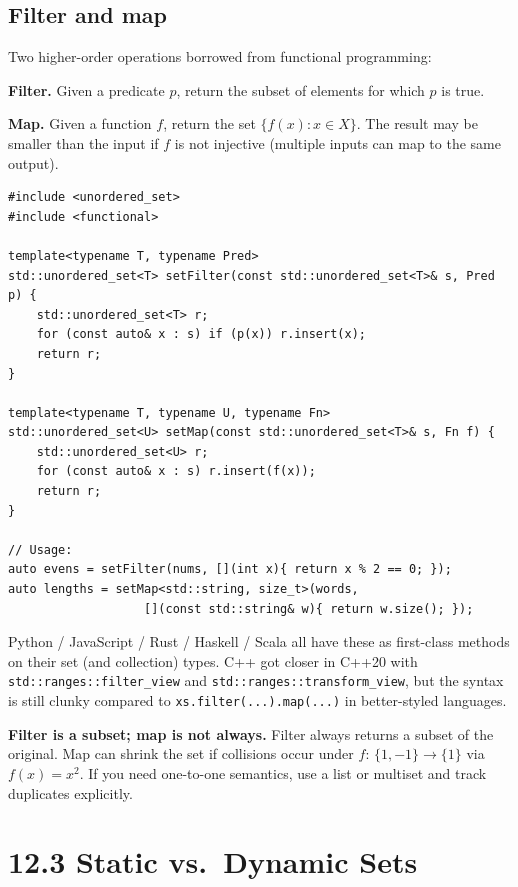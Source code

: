 \documentclass[11pt]{article}
\begin{document}
\subsection*{Filter and map}

Two higher-order operations borrowed from functional programming:

\begin{defnbox}
\textbf{Filter.} Given a predicate $p$, return the subset of elements for which $p$ is true.

\textbf{Map.} Given a function $f$, return the set $\{f(x) : x \in X\}$. The result may be smaller than the input if $f$ is not injective (multiple inputs can map to the same output).
\end{defnbox}

\begin{lstlisting}[basicstyle=\ttfamily\small,frame=single]
#include <unordered_set>
#include <functional>

template<typename T, typename Pred>
std::unordered_set<T> setFilter(const std::unordered_set<T>& s, Pred p) {
    std::unordered_set<T> r;
    for (const auto& x : s) if (p(x)) r.insert(x);
    return r;
}

template<typename T, typename U, typename Fn>
std::unordered_set<U> setMap(const std::unordered_set<T>& s, Fn f) {
    std::unordered_set<U> r;
    for (const auto& x : s) r.insert(f(x));
    return r;
}

// Usage:
auto evens = setFilter(nums, [](int x){ return x % 2 == 0; });
auto lengths = setMap<std::string, size_t>(words,
                   [](const std::string& w){ return w.size(); });
\end{lstlisting}

Python / JavaScript / Rust / Haskell / Scala all have these as first-class methods on their set (and collection) types. C++ got closer in C++20 with \texttt{std::ranges::filter\_view} and \texttt{std::ranges::transform\_view}, but the syntax is still clunky compared to \texttt{xs.filter(...).map(...)} in better-styled languages.

\begin{notebox}
\textbf{Filter is a subset; map is not always.} Filter always returns a subset of the original. Map can shrink the set if collisions occur under $f$: $\{1, -1\} \to \{1\}$ via $f(x) = x^2$. If you need one-to-one semantics, use a list or multiset and track duplicates explicitly.
\end{notebox}

\section{12.3 Static vs.\ Dynamic Sets}
\end{document}
